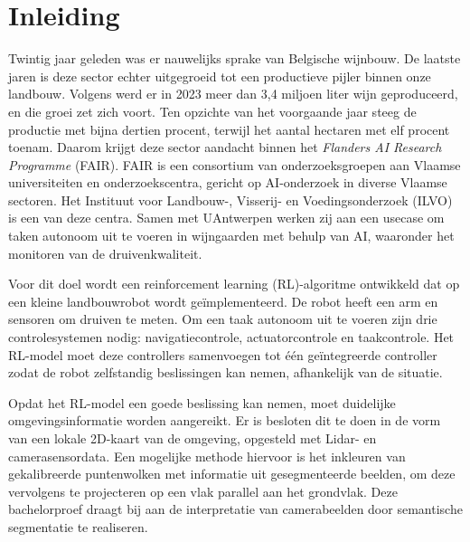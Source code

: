


% 

\section{Inleiding}%
\label{sec:inleiding}

Twintig jaar geleden was er nauwelijks sprake van Belgische wijnbouw. De laatste jaren is deze sector echter uitgegroeid tot een productieve pijler binnen onze landbouw. Volgens \textcite{FODEconomie2024} werd er in 2023 meer dan 3,4 miljoen liter wijn geproduceerd, en die groei zet zich voort. Ten opzichte van het voorgaande jaar steeg de productie met bijna dertien procent, terwijl het aantal hectaren met elf procent toenam. Daarom krijgt deze sector aandacht binnen het\textit{ Flanders AI Research Programme} (FAIR). FAIR is een consortium van onderzoeksgroepen aan Vlaamse universiteiten en onderzoekscentra, gericht op AI-onderzoek in diverse Vlaamse sectoren. Het Instituut voor Landbouw-, Visserij- en Voedingsonderzoek (ILVO) is een van deze centra. Samen met UAntwerpen werken zij aan een usecase om taken autonoom uit te voeren in wijngaarden met behulp van AI, waaronder het monitoren van de druivenkwaliteit. 

Voor dit doel wordt een reinforcement learning (RL)-algoritme ontwikkeld dat op een kleine landbouwrobot wordt geïmplementeerd. De robot heeft een arm en sensoren om druiven te meten. Om een taak autonoom uit te voeren zijn drie controlesystemen nodig: navigatiecontrole, actuatorcontrole en taakcontrole. Het RL-model moet deze controllers samenvoegen tot één geïntegreerde controller zodat de robot zelfstandig beslissingen kan nemen, afhankelijk van de situatie.

Opdat het RL-model een goede beslissing kan nemen, moet duidelijke omgevingsinformatie worden aangereikt. Er is besloten dit te doen in de vorm van een lokale 2D-kaart van de omgeving, opgesteld met Lidar- en camerasensordata. Een mogelijke methode hiervoor is het inkleuren van gekalibreerde puntenwolken met informatie uit gesegmenteerde beelden, om deze vervolgens te projecteren op een vlak parallel aan het grondvlak. Deze bachelorproef draagt bij aan de interpretatie van camerabeelden door semantische segmentatie te realiseren.

